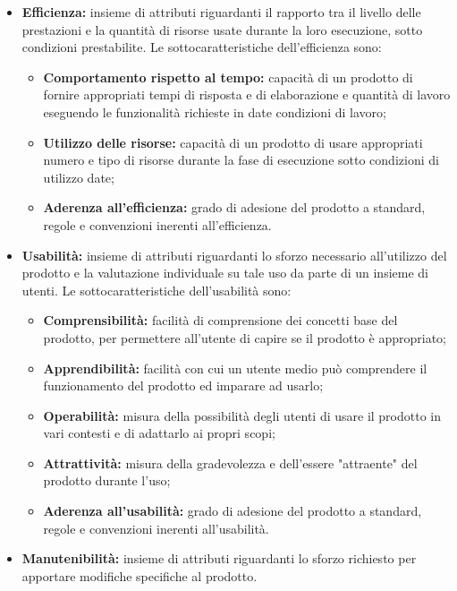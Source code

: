 \begin{itemize}
\begin{itemize}
          \end{itemize}
    \item \textbf{Efficienza:} insieme di attributi riguardanti il rapporto tra il livello delle prestazioni e la quantità di risorse usate durante la loro esecuzione, sotto condizioni prestabilite.
          Le sottocaratteristiche dell'efficienza sono:
          \begin{itemize}
              \item \textbf{Comportamento rispetto al tempo:} capacità di un prodotto di fornire appropriati tempi di risposta e di elaborazione e quantità di lavoro eseguendo le funzionalità richieste in date condizioni di lavoro;
              \item \textbf{Utilizzo delle risorse:} capacità di un prodotto di usare appropriati numero e tipo di risorse durante la fase di esecuzione sotto condizioni di utilizzo date;
              \item \textbf{Aderenza all'efficienza:} grado di adesione del prodotto a standard, regole e convenzioni inerenti all'efficienza.
          \end{itemize}
    \item \textbf{Usabilità:} insieme di attributi riguardanti lo sforzo necessario all'utilizzo del prodotto e la valutazione individuale su tale uso da parte di un insieme di utenti.
          Le sottocaratteristiche dell'usabilità sono:
          \begin{itemize}
              \item \textbf{Comprensibilità:} facilità di comprensione dei concetti base del prodotto, per permettere all'utente di capire se il prodotto è appropriato;
              \item \textbf{Apprendibilità:} facilità con cui un utente medio può comprendere il funzionamento del prodotto ed imparare ad usarlo;
              \item \textbf{Operabilità:} misura della possibilità degli utenti di usare il prodotto in vari contesti e di adattarlo ai propri scopi;
              \item \textbf{Attrattività:} misura della gradevolezza e dell'essere "attraente" del prodotto durante l'uso;
              \item \textbf{Aderenza all'usabilità:} grado di adesione del prodotto a standard, regole e convenzioni inerenti all'usabilità.
          \end{itemize}
    \item \textbf{Manutenibilità:} insieme di attributi riguardanti lo sforzo richiesto per apportare modifiche specifiche al prodotto.

\end{itemize}
